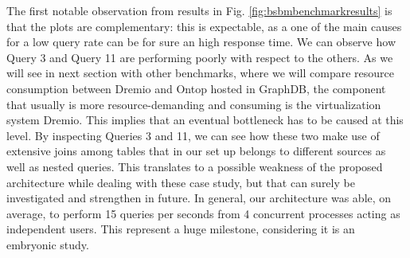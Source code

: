 The first notable observation from results in Fig. \ref{fig:bsbmbenchmarkresults} is that the plots are complementary: this is expectable, as a one of the main causes for a low query rate can be for sure an high response time.
We can observe how Query 3 and Query 11 are performing poorly with respect to the others. As we will see in next section with other benchmarks, where we will compare resource consumption between Dremio and Ontop hosted in GraphDB, the component that usually is more resource-demanding and consuming is the virtualization system Dremio. This implies that an eventual bottleneck has to be caused at this level. By inspecting Queries 3 and 11, we can see how these two make use of extensive joins among tables that in our set up belongs to different sources as well as nested queries. This translates to a possible weakness of the proposed architecture while dealing with these case study, but that can surely be investigated and strengthen in future.
In general, our architecture was able, on average, to perform 15 queries per seconds from 4 concurrent processes acting as independent users. This represent a huge milestone, considering it is an embryonic study.